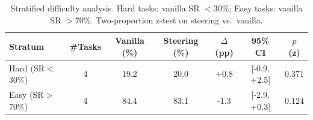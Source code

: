 \begin{table}[t]
\centering
\caption{Stratified difficulty analysis. Hard tasks: vanilla SR $<$30\%; Easy tasks: vanilla SR $>$70\%. Two-proportion z-test on steering vs.\ vanilla.}
\label{tab:stratified_difficulty}
\begin{tabular}{lcccccc}
\toprule
Stratum & \#Tasks & Vanilla (\%) & Steering (\%) & $\Delta$ (pp) & 95\% CI & $p$ (z) \\
\midrule
Hard (SR$<$30\%) & 4 & 19.2 & 20.0 & +0.8 & [-0.9, +2.5] & 0.371 \\
Easy (SR$>$70\%) & 4 & 84.4 & 83.1 & -1.3 & [-2.9, +0.3] & 0.124 \\
\bottomrule
\end{tabular}
\end{table}
